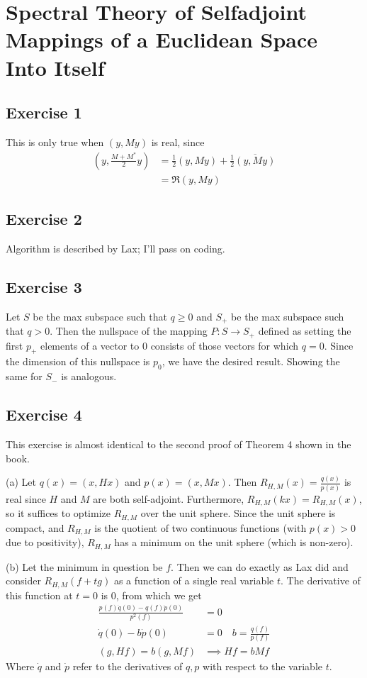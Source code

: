 \section{Spectral Theory of Selfadjoint Mappings of a Euclidean Space Into Itself}

\subsection{Exercise 1}
This is only true when $(y, My)$ is real, since
\begin{align*}
        (y, \frac{M + M^{*}}{2}y) &= \frac{1}{2} (y, My) + \frac{1}{2} \overline{(y, My)} \\
                                  &= \Re (y, My)
\end{align*}

\subsection{Exercise 2}
Algorithm is described by Lax; I'll pass on coding.

\subsection{Exercise 3}
Let $S$ be the max subspace such that $q \geq 0$ and $S_+$ be the max subspace such that $q > 0$.
Then the nullspace of the mapping $P: S \to S_+$ defined as setting the first $p_+$ elements of a vector to 0 
consists of those vectors for which $q = 0$. Since the dimension of this nullspace is $p_0$, we have the
desired result. Showing the same for $S_-$ is analogous.

\subsection{Exercise 4}
This exercise is almost identical to the second proof of Theorem 4 shown in the book.

(a) Let $q(x) = (x, Hx)$ and $p(x) = (x, Mx)$. Then $R_{H,M} (x) = \frac{q(x)}{p(x)}$ is real
since $H$ and $M$ are both self-adjoint. Furthermore, $R_{H,M} (kx) = R_{H,M} (x)$, so it suffices
to optimize $R_{H,M}$ over the unit sphere. Since the unit sphere is compact, and $R_{H,M}$ is the
quotient of two continuous functions (with $p(x) > 0$ due to positivity), $R_{H, M}$ has a minimum
on the unit sphere (which is non-zero).

(b) Let the minimum in question be $f$. Then we can do exactly as Lax did and consider $R_{H,M}(f + tg)$ 
as a function of a single real variable $t$. The derivative of this function at $t = 0$ is $0$, from which
we get
\begin{align*}
        \frac{p(f) \dot{q}(0) - q(f) \dot{p}(0)}{p^2(f)} &= 0 \\
        \dot{q}(0) - b\dot{p}(0) &= 0 \quad b = \frac{q(f)}{p(f)} \\
        (g, Hf) = b (g, Mf) &\implies Hf = bMf
\end{align*}
Where $\dot{q}$ and $\dot{p}$ refer to the derivatives of $q, p$ with respect to the variable $t$.

